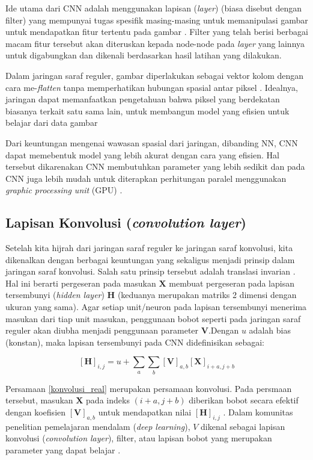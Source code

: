 Ide utama dari CNN adalah menggunakan lapisan (\emph{layer}) (biasa disebut dengan filter) yang mempunyai tugas spesifik masing-masing untuk memanipulasi gambar untuk mendapatkan fitur tertentu pada gambar \citep{zocca_spacagna_slater_roelants_2017}. Filter yang telah berisi berbagai macam fitur tersebut akan diteruskan kepada node-node pada \emph{layer} yang lainnya untuk digabungkan dan dikenali berdasarkan hasil latihan yang dilakukan.

Dalam jaringan saraf reguler, gambar diperlakukan sebagai vektor kolom dengan cara me-\emph{flatten} tanpa memperhatikan hubungan spasial antar piksel \citep{zhang2023dive}. Idealnya, jaringan dapat memanfaatkan pengetahuan bahwa piksel yang berdekatan biasanya terkait satu sama lain, untuk membangun model yang efisien untuk belajar dari data gambar \citep*{zhang2023dive}

Dari keuntungan mengenai wawasan spasial dari jaringan, dibanding NN, CNN dapat memebentuk model yang lebih akurat dengan cara yang efisien. Hal tersebut dikarenakan CNN membutuhkan parameter yang lebih sedikit dan pada CNN juga lebih mudah untuk diterapkan perhitungan paralel menggunakan \emph{graphic processing unit} (GPU) \citep{chetlur2014cudnn}.

\subsection{Lapisan Konvolusi (\emph{convolution layer})}
Setelah kita hijrah dari jaringan saraf reguler ke jaringan saraf konvolusi, kita dikenalkan dengan berbagai keuntungan yang sekaligus menjadi prinsip dalam jaringan saraf konvolusi. Salah satu prinsip tersebut adalah translasi invarian \citep{1992SPIE.1709..257Z}. Hal ini berarti pergeseran pada masukan $\textbf{X}$ membuat pergeseran pada lapisan tersembunyi (\emph{hidden layer}) $\textbf{H}$ (keduanya merupakan matriks 2 dimensi dengan ukuran yang sama). Agar setiap unit/neuron pada lapisan tersembunyi menerima masukan dari tiap unit masukan, penggunaan bobot seperti pada jaringan saraf reguler akan diubha menjadi penggunaan parameter $\textbf{V}$.Dengan $u$ adalah bias (konstan), maka lapisan tersembunyi pada CNN didefinisikan sebagai:

\begin{equation}\label{konvolusi_real}
    [\textbf{H}]_{i,j} = u + \sum\limits_a \sum\limits_b [\textbf{V}]_{a,b} [\textbf{X}]_{i+a,j+b}
\end{equation}

Persamaan \eqref{konvolusi_real} merupakan persamaan konvolusi. Pada persmaan tersebut, masukan $\textbf{X}$ pada indeks $(i+a, j+b)$ diberikan bobot secara efektif dengan koefisien $[\textbf{V}]_{a,b}$ untuk mendapatkan nilai $[\textbf{H}]_{i,j}$ \citep{zhang2023dive}. Dalam komunitas penelitian pemelajaran mendalam (\emph{deep learning}), \textbf{$V$} dikenal sebagai lapisan konvolusi (\emph{convolution layer}), filter, atau lapisan bobot yang merupakan parameter yang dapat belajar \citep{zhang2023dive}.


